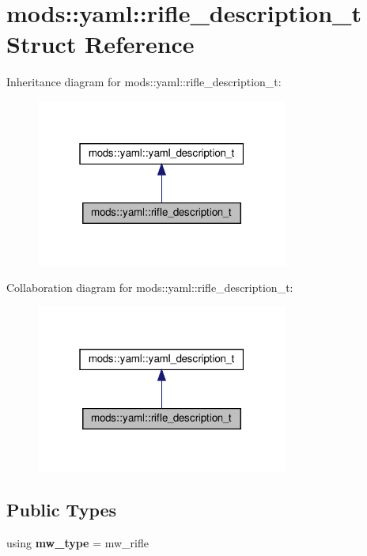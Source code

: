 \hypertarget{structmods_1_1yaml_1_1rifle__description__t}{}\section{mods\+:\+:yaml\+:\+:rifle\+\_\+description\+\_\+t Struct Reference}
\label{structmods_1_1yaml_1_1rifle__description__t}


Inheritance diagram for mods\+:\+:yaml\+:\+:rifle\+\_\+description\+\_\+t\+:\nopagebreak
\begin{figure}[H]
\begin{center}
\leavevmode
\includegraphics[width=235pt]{structmods_1_1yaml_1_1rifle__description__t__inherit__graph}
\end{center}
\end{figure}


Collaboration diagram for mods\+:\+:yaml\+:\+:rifle\+\_\+description\+\_\+t\+:\nopagebreak
\begin{figure}[H]
\begin{center}
\leavevmode
\includegraphics[width=235pt]{structmods_1_1yaml_1_1rifle__description__t__coll__graph}
\end{center}
\end{figure}
\subsection*{Public Types}
\begin{DoxyCompactItemize}
\item 
\mbox{\label{structmods_1_1yaml_1_1rifle__description__t_ab670fbe99b59e026078a31b444d9179c}} 
using {\bfseries mw\+\_\+type} = mw\+\_\+rifle
\end{DoxyCompactItemize}
